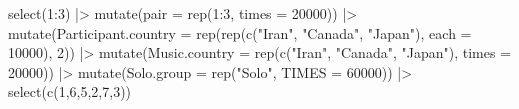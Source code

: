 \documentclass[
  bookmarksnumbered]{article}
\newenvironment{Shaded}{\begin{snugshade}}{\end{snugshade}}
\newcommand{\AttributeTok}[1]{\textcolor[rgb]{0.80,0.80,0.80}{#1}}
\newcommand{\DecValTok}[1]{\textcolor[rgb]{0.86,0.86,0.80}{#1}}
\newcommand{\FunctionTok}[1]{\textcolor[rgb]{0.94,0.94,0.56}{#1}}
\newcommand{\NormalTok}[1]{\textcolor[rgb]{0.80,0.80,0.80}{#1}}
\newcommand{\SpecialCharTok}[1]{\textcolor[rgb]{0.86,0.64,0.64}{#1}}
\newcommand{\StringTok}[1]{\textcolor[rgb]{0.80,0.58,0.58}{#1}}
\begin{document}
\begin{Shaded}
\begin{Highlighting}[]
  \FunctionTok{select}\NormalTok{(}\DecValTok{1}\SpecialCharTok{:}\DecValTok{3}\NormalTok{) }\SpecialCharTok{|\textgreater{}}
  \FunctionTok{mutate}\NormalTok{(}\AttributeTok{pair =} \FunctionTok{rep}\NormalTok{(}\DecValTok{1}\SpecialCharTok{:}\DecValTok{3}\NormalTok{, }\AttributeTok{times =} \DecValTok{20000}\NormalTok{)) }\SpecialCharTok{|\textgreater{}}
  \FunctionTok{mutate}\NormalTok{(}\AttributeTok{Participant.country =} \FunctionTok{rep}\NormalTok{(}\FunctionTok{rep}\NormalTok{(}\FunctionTok{c}\NormalTok{(}\StringTok{"Iran"}\NormalTok{, }\StringTok{"Canada"}\NormalTok{, }\StringTok{"Japan"}\NormalTok{), }\AttributeTok{each =} \DecValTok{10000}\NormalTok{), }\DecValTok{2}\NormalTok{)) }\SpecialCharTok{|\textgreater{}}
  \FunctionTok{mutate}\NormalTok{(}\AttributeTok{Music.country =} \FunctionTok{rep}\NormalTok{(}\FunctionTok{c}\NormalTok{(}\StringTok{"Iran"}\NormalTok{, }\StringTok{"Canada"}\NormalTok{, }\StringTok{"Japan"}\NormalTok{), }\AttributeTok{times =} \DecValTok{20000}\NormalTok{)) }\SpecialCharTok{|\textgreater{}}
  \FunctionTok{mutate}\NormalTok{(}\AttributeTok{Solo.group =} \FunctionTok{rep}\NormalTok{(}\StringTok{"Solo"}\NormalTok{, }\AttributeTok{TIMES =} \DecValTok{60000}\NormalTok{)) }\SpecialCharTok{|\textgreater{}}
  \FunctionTok{select}\NormalTok{(}\FunctionTok{c}\NormalTok{(}\DecValTok{1}\NormalTok{,}\DecValTok{6}\NormalTok{,}\DecValTok{5}\NormalTok{,}\DecValTok{2}\NormalTok{,}\DecValTok{7}\NormalTok{,}\DecValTok{3}\NormalTok{))}


\end{Highlighting}
\end{Shaded}
\end{document}
